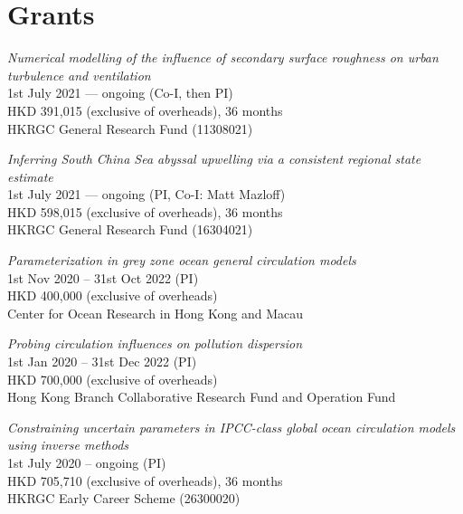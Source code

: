 \documentclass[letterpaper]{article}
\renewenvironment{itemize}{
  \begin{list}{}{
    \setlength{\leftmargin}{1.5em}
  }
}{
  \end{list}
}
\begin{document}
\section*{Grants}

\begin{itemize}

\item[--] \textit{Numerical modelling of the influence of secondary surface roughness on urban turbulence and ventilation}\\
1st July 2021 --- ongoing (Co-I, then PI)\\
HKD 391,015 (exclusive of overheads), 36 months\\
HKRGC General Research Fund (11308021)

\item[--] \textit{Inferring South China Sea abyssal upwelling via a consistent regional state estimate}\\
1st July 2021 --- ongoing (PI, Co-I: Matt Mazloff)\\
HKD 598,015 (exclusive of overheads), 36 months\\
HKRGC General Research Fund (16304021)

\item[--] \textit{Parameterization in grey zone ocean general circulation models}\\
1st Nov 2020 -- 31st Oct 2022 (PI)\\
HKD 400,000 (exclusive of overheads)\\
Center for Ocean Research in Hong Kong and Macau

\item[--] \textit{Probing circulation influences on pollution dispersion}\\
1st Jan 2020 -- 31st Dec 2022 (PI)\\
HKD 700,000 (exclusive of overheads)\\ 
Hong Kong Branch Collaborative Research Fund and Operation Fund

\item[--] \textit{Constraining uncertain parameters in IPCC-class global ocean
circulation models using inverse methods}\\
1st July 2020 -- ongoing (PI)\\
HKD 705,710 (exclusive of overheads), 36 months \\
HKRGC Early Career Scheme (26300020)

\end{itemize}

\end{document}
